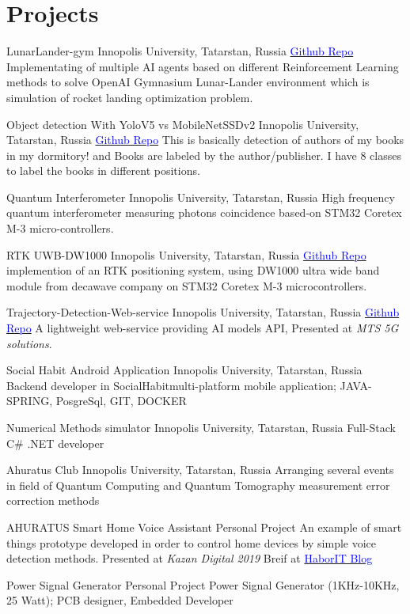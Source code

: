\section{Projects}

    {LunarLander-gym}
    {Innopolis University, Tatarstan, Russia}{}{}
    {\href{https://github.com/Ehsan2754/lunarlander_gym}{\textcolor{blue}{Github Repo}}  
    Implementating of multiple AI agents based on different Reinforcement Learning methods to solve OpenAI Gymnasium Lunar-Lander environment which is simulation of rocket landing optimization problem.  }
    
    {Object detection With YoloV5 vs MobileNetSSDv2}
    {Innopolis University, Tatarstan, Russia}{}{}
    {\href{https://github.com/Ehsan2754/ObjectDetection}{\textcolor{blue}{Github Repo}}  
   This is basically detection of authors of my books in my dormitory! and Books are labeled by the author/publisher. I have 8 classes to label the books in different positions.}
    

    {Quantum Interferometer}
    {Innopolis University, Tatarstan, Russia}{}{}
    {High frequency quantum interferometer measuring photons coincidence based-on STM32 Coretex M-3 micro-controllers.}
    
    {RTK UWB-DW1000}
    {Innopolis University, Tatarstan, Russia}{}{}
    {\href{https://github.com/Ehsan2754/RTK-DW1000/tree/main/Client}{\textcolor{blue}{Github Repo}}  implemention of an RTK positioning system, using DW1000 ultra wide band module from decawave company on STM32 Coretex M-3 microcontrollers.}

    {Trajectory-Detection-Web-service }
    {Innopolis University, Tatarstan, Russia}{}{}
    {\href{https://github.com/Ahuratus/Trajectory-Detection-Web-services/tree/main/web}{\textcolor{blue}{Github Repo}} A lightweight web-service providing AI models API, Presented  at \textit{MTS 5G solutions}. }

    {Social Habit Android Application}
    {Innopolis University, Tatarstan, Russia}{}{}
    {Backend developer in SocialHabit\texttrademark multi-platform mobile application; JAVA-SPRING, PosgreSql, GIT, DOCKER}
    

    {Numerical Methods simulator}
    {Innopolis University, Tatarstan, Russia}{}{}
    {Full-Stack C\# .NET developer}


    {Ahuratus Club}
    {Innopolis University, Tatarstan, Russia}{}{}
    {Arranging several events in field of Quantum Computing and Quantum Tomography measurement error correction methods}

    {AHURATUS Smart Home Voice Assistant}
    {Personal Project}{}{}
    {An example of smart things prototype developed in order to control home devices by simple voice detection methods. Presented at \textit{Kazan Digital 2019} Breif at \href{https://habr.com/en/post/475960/}{\textcolor{blue}{Habor\texttrademark IT Blog}}}

    {Power Signal Generator}
    {Personal Project}{}{}
    {Power Signal Generator (1KHz-10KHz, 25 Watt); PCB designer, Embedded Developer}
